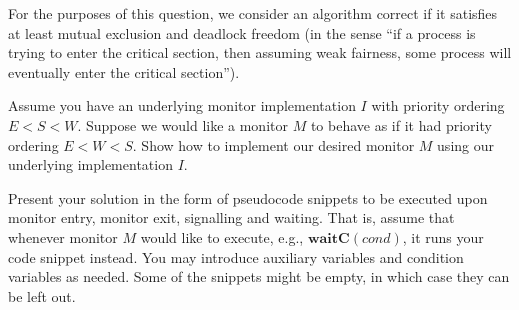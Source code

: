 \documentclass[a4paper,answers]{exam}
\begin{document}
\begin{questions}
\begin{parts}
  For the purposes of this question, we consider an algorithm correct
  if it satisfies at least mutual exclusion and deadlock freedom (in
  the sense ``if a process is trying to enter the critical section,
  then assuming weak fairness, some process will eventually enter the critical section'').
\end{parts}

\question[15]


Assume you have an underlying monitor implementation $I$ with priority ordering $E
< S < W$.
Suppose we would like a monitor $M$ to behave as if it had priority ordering 
$E < W < S$.
Show how to implement our desired monitor $M$ using our underlying implementation $I$.

Present your solution in the form of pseudocode snippets to be executed upon
monitor entry, monitor exit, signalling and waiting. That is, assume
that whenever monitor $M$ would like to execute, e.g., $\mathbf{waitC}(\mathit{cond})$, it
runs your code snippet instead.
You may introduce auxiliary variables and condition variables as
needed.
Some of the snippets might be empty, in which case they can be left out.

\question[10]

\end{questions}
\end{document}
